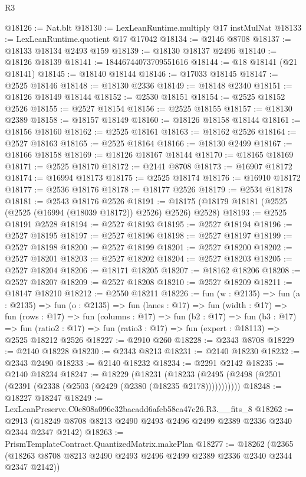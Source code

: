 \begin{lexlean}{R3}
\begin{coremodule}
@18126 := Nat.blt
@18130 := LexLeanRuntime.multiply @17 instMulNat
@18133 := LexLeanRuntime.quotient @17 @17042
@18134 := @2146 @8708
@18137 := @18133 @18134 @2493 @159
@18139 := @18130 @18137 @2496
@18140 := @18126 @18139
@18141 := 18446744073709551616
@18144 := @18 @18141 (@21 @18141)
@18145 := @18140 @18144
@18146 := @17033 @18145
@18147 := @2525 @18146
@18148 := @18130 @2336
@18149 := @18148 @2340
@18151 := @18126 @18149 @18144
@18152 := @2530 @18151
@18154 := @2525 @18152 @2526
@18155 := @2527 @18154
@18156 := @2525 @18155
@18157 := @18130 @2389
@18158 := @18157 @18149
@18160 := @18126 @18158 @18144
@18161 := @18156 @18160
@18162 := @2525 @18161
@18163 := @18162 @2526
@18164 := @2527 @18163
@18165 := @2525 @18164
@18166 := @18130 @2499
@18167 := @18166 @18158
@18169 := @18126 @18167 @18144
@18170 := @18165 @18169
@18171 := @2525 @18170
@18172 := @2141 @8708
@18173 := @16907 @18172
@18174 := @16994 @18173
@18175 := @2525 @18174
@18176 := @16910 @18172
@18177 := @2536 @18176
@18178 := @18177 @2526
@18179 := @2534 @18178
@18181 := @2543 @18176 @2526
@18191 := @18175 (@18179 @18181 (@2525 (@2525 (@16994 (@18039 @18172)) @2526) @2526) @2528)
@18193 := @2525 @18191 @2528
@18194 := @2527 @18193
@18195 := @2527 @18194
@18196 := @2527 @18195
@18197 := @2527 @18196
@18198 := @2527 @18197
@18199 := @2527 @18198
@18200 := @2527 @18199
@18201 := @2527 @18200
@18202 := @2527 @18201
@18203 := @2527 @18202
@18204 := @2527 @18203
@18205 := @2527 @18204
@18206 := @18171 @18205
@18207 := @18162 @18206
@18208 := @2527 @18207
@18209 := @2527 @18208
@18210 := @2527 @18209
@18211 := @18147 @18210
@18212 := @2550 @18211
@18226 := fun (w : @2135) =>
  fun (a : @2135) =>
  fun (o : @2135) =>
  fun (lanes : @17) =>
  fun (width : @17) =>
  fun (rows : @17) =>
  fun (columns : @17) =>
  fun (b2 : @17) =>
  fun (b3 : @17) =>
  fun (ratio2 : @17) => fun (ratio3 : @17) => fun (expert : @18113) => @2525 @18212 @2526
@18227 := @2910 @260
@18228 := @2343 @8708
@18229 := @2140 @18228
@18230 := @2343 @8213
@18231 := @2140 @18230
@18232 := @2343 @2490
@18233 := @2140 @18232
@18234 := @2291 @2142
@18235 := @2140 @18234
@18247 := @18229
    (@18231 (@18233 (@2495 (@2498 (@2501 (@2391 (@2338 (@2503 (@2429 (@2380 (@18235 @2178)))))))))))
@18248 := @18227 @18247
@18249 := LexLeanPreserve.C0c808a096c32bacadd6afeb58ea47c26.R3.__fits_8
@18262 := @2913 (@18249 @8708 @8213 @2490 @2493 @2496 @2499 @2389 @2336 @2340 @2344 @2347 @2142)
@18263 := PrismTemplateContract.QuantizedMatrix.makePlan
@18277 := @18262
    (@2365 (@18263 @8708 @8213 @2490 @2493 @2496 @2499 @2389 @2336 @2340 @2344 @2347 @2142))

\end{coremodule}
\end{lexlean}
